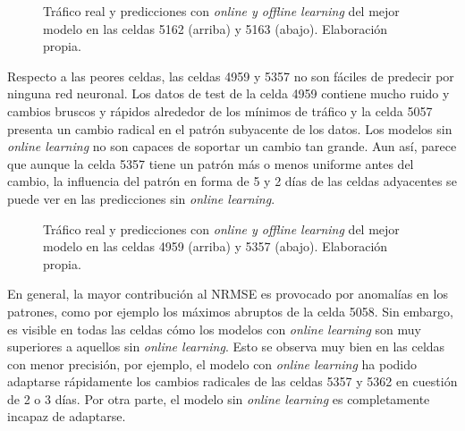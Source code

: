 \begin{figure}[h!]
	\centering
	\begin{subfigure}{\linewidth}
		
	\end{subfigure}
	\begin{subfigure}{\linewidth}
		
	\end{subfigure}
	\caption{Tráfico real y predicciones con \textit{online y \textit{offline learning}} del mejor modelo en las celdas 5162 (arriba) y 5163 (abajo). Elaboración propia.}
	\label{fig:bestcells}
\end{figure}
\FloatBarrier




Respecto a las peores celdas, las celdas 4959 y 5357 no son fáciles de predecir por ninguna red neuronal. Los datos de test de la celda 4959 contiene mucho ruido y cambios bruscos y rápidos alrededor de los mínimos de tráfico y la celda 5057 presenta un cambio radical en el patrón subyacente de los datos. Los modelos sin \textit{online learning} no son capaces de soportar un cambio tan grande. Aun así, parece que aunque la celda 5357 tiene un patrón más o menos uniforme antes del cambio, la influencia del patrón en forma de 5 y 2 días de las celdas adyacentes se puede ver en las predicciones sin \textit{online learning}.


\begin{figure}[h!]
	\centering
	\begin{subfigure}{\linewidth}
		
	\end{subfigure}
	\begin{subfigure}{\linewidth}
		
	\end{subfigure}
	\caption{Tráfico real y predicciones con \textit{online y \textit{offline learning}} del mejor modelo en las celdas 4959 (arriba) y 5357 (abajo). Elaboración propia.}
	\label{fig:worstcells}
\end{figure}
\FloatBarrier




En general, la mayor contribución al NRMSE es provocado por anomalías en los patrones, como por ejemplo los máximos abruptos de la celda 5058. Sin embargo, es visible en todas las celdas cómo los modelos con \textit{online learning} son muy superiores a aquellos sin \textit{online learning}. Esto se observa muy bien en las celdas con menor precisión, por ejemplo, el modelo con \textit{online learning} ha podido adaptarse rápidamente los cambios radicales de las celdas 5357 y 5362 en cuestión de 2 o 3 días. Por otra parte, el modelo sin \textit{online learning} es completamente incapaz de adaptarse.


